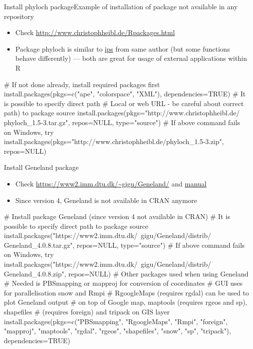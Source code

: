 \documentclass[compress, ucs, xelatex, 11pt, xcolor=svgnames,
  hyperref={
    bookmarks=true,
    unicode=true,
    colorlinks=true,
    pdftitle={Molecular data in R},
    plainpages=false,
    pdfauthor={Vojtech Zeisek},
    pdfsubject={Course about phylogeny and evolution in R},
    pdfcreator={XeLaTeX},
    pdfkeywords={R, evolution, phylogeny, molecular data},
    linkcolor=Tomato,
    anchorcolor=SaddleBrown,
    citecolor=Goldenrod,
    filecolor=DarkMagenta,
    menucolor=Sienna,
    urlcolor=DarkTurquoise,
    pdftex},
  url={hyphens, lowtilde} %
  ]{beamer}
\begin{document}
\begin{frame}[fragile]{Install phyloch package}{Example of installation of package not available in any repository}
  \label{phyloch}
  \begin{itemize}
    \item Check \url{http://www.christophheibl.de/Rpackages.html} 
    \item Package phyloch is similar to \href{https://CRAN.R-project.org/package=ips}{ips} from same author (but some functions behave differently) --- both are great for usage of external applications within R
  \end{itemize}
  \begin{spluscode}
    # If not done already, install required packages first
    install.packages(pkgs=c("ape", "colorspace", "XML"),
      dependencies=TRUE)
    # It is possible to specify direct path
    # Local or web URL - be careful about correct path) to package source
    install.packages(pkgs="http://www.christophheibl.de/
      phyloch_1.5-3.tar.gz", repos=NULL, type="source")
    # If above command fails on Windows, try
    install.packages(pkgs="http://www.christophheibl.de/phyloch_1.5-3.zip",
      repos=NULL)
  \end{spluscode}
\end{frame}

\begin{frame}[fragile]{Install Geneland package}
  \label{Geneland}
  \begin{itemize}
    \item Check \url{https://www2.imm.dtu.dk/~gigu/Geneland/} and \href{https://www2.imm.dtu.dk/~gigu/Geneland/Geneland-Doc.pdf}{manual}
    \item Since version 4, Geneland is not available in CRAN anymore
  \end{itemize}
  \begin{spluscode}
    # Install package Geneland (since version 4 not available in CRAN)
    # It is possible to specify direct path to package source
    install.packages("https://www2.imm.dtu.dk/~gigu/Geneland/distrib/
      Geneland_4.0.8.tar.gz", repos=NULL, type="source")
    # If above command fails on Windows, try
    install.packages("https://www2.imm.dtu.dk/~gigu/Geneland/distrib/
      Geneland_4.0.8.zip", repos=NULL)
    # Other packages used when using Geneland
    # Needed is PBSmapping or mapproj for conversion of coordinates
    # GUI uses for parallelisation snow and Rmpi
    # RgoogleMaps (requires rgdal) can be used to plot Geneland output
    # on top of Google map, maptools (requires rgeos and sp), shapefiles
    # (requires foreign) and tripack on GIS layer
    install.packages(pkgs=c("PBSmapping", "RgoogleMaps", "Rmpi", "foreign",
     "mapproj", "maptools", "rgdal", "rgeos", "shapefiles", "snow", "sp",
     "tripack"), dependencies=TRUE)
  \end{spluscode}
\end{frame}
\end{document}

